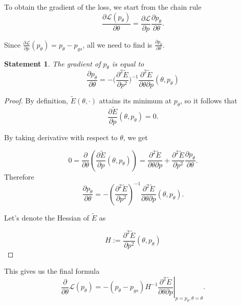 \documentclass[a4paper,10.5pt]{report}
\newtheorem{statement}{Statement}
\begin{document}
To obtain the gradient of the loss, we start from the chain rule
\begin{equation}
 \frac{\partial \mathcal{L}(p_\theta)}{\partial \theta} = \frac{\partial \mathcal{L}}{\partial p}\frac{\partial p_\theta}{\partial \theta}.
\end{equation}

Since $\frac{\partial \mathcal{L}}{\partial p}(p_\theta)= p_\theta-p_{gs}$, all we need to find is $\frac{\partial p_\theta}{\partial \theta}.$

\begin{statement}
The gradient of $p_\theta$ is equal to
 \begin{equation}
   \frac{\partial p_\theta}{\partial \theta} = -\bigg(\frac{\partial^2 \widetilde{E}}{\partial p^2}\bigg)^{-1} \frac{\partial^2 \widetilde{E}}{\partial \theta \partial p}(\theta, p_\theta)
 \end{equation}
\end{statement}

\begin{proof}
By definition, $\widetilde{E}(\theta, \cdot)$ attains its minimum at $p_\theta$, so it follows that
\begin{equation}
\frac{\partial \widetilde{E}}{\partial p}(\theta, p_\theta) = 0.
\end{equation}

By taking derivative with respect to $\theta$, we get

\begin{equation}
0=\frac{\partial}{\partial \theta}\left(\frac{\partial \widetilde{E}}{\partial p}(\theta, p_\theta)\right) = \frac{\partial^2 \widetilde{E}}{\partial \theta \partial p} + \frac{\partial^2 \widetilde{E}}{\partial p^2} \frac{\partial p_\theta}{\partial \theta}.
\end{equation}
Therefore
\begin{equation}
 \frac{\partial p_\theta}{\partial \theta} = -\left(\frac{\partial^2 \widetilde{E}}{\partial p^2}\right)^{-1} \frac{\partial^2 \widetilde{E}}{\partial \theta \partial p}(\theta, p_\theta).
\end{equation}

Let's denote the Hessian of $\widetilde{E}$ as

\begin{equation}
H := \frac{\partial^2 \widetilde{E}}{\partial p^2}(\theta,p_\theta)
\end{equation}
\end{proof}
This gives us the final formula
\begin{equation}
 \frac{\partial}{\partial \theta}\mathcal{L}(p_\theta) = - (p_\theta - p_{gs}) H^{-1}  \left.\frac{\partial^2 \widetilde{E}}{\partial \theta \partial p}\right|_{p=p_\theta, \theta=\theta}.
\end{equation}
\end{document}

